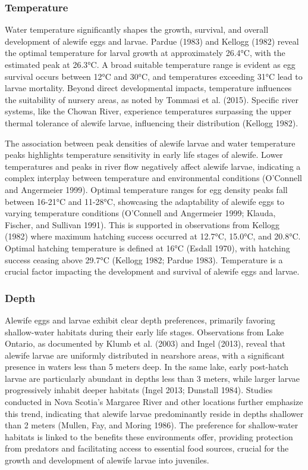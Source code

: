 \documentclass[
]{book}
\begin{document}
\hypertarget{temperature-2}{%
\subsubsection{Temperature}\label{temperature-2}}

Water temperature significantly shapes the growth, survival, and overall development of alewife eggs and larvae. Pardue (1983) and Kellogg (1982) reveal the optimal temperature for larval growth at approximately 26.4°C, with the estimated peak at 26.3°C. A broad suitable temperature range is evident as egg survival occurs between 12°C and 30°C, and temperatures exceeding 31°C lead to larvae mortality. Beyond direct developmental impacts, temperature influences the suitability of nursery areas, as noted by Tommasi et al. (2015). Specific river systems, like the Chowan River, experience temperatures surpassing the upper thermal tolerance of alewife larvae, influencing their distribution (Kellogg 1982).

The association between peak densities of alewife larvae and water temperature peaks highlights temperature sensitivity in early life stages of alewife. Lower temperatures and peaks in river flow negatively affect alewife larvae, indicating a complex interplay between temperature and environmental conditions (O'Connell and Angermeier 1999). Optimal temperature ranges for egg density peaks fall between 16-21°C and 11-28°C, showcasing the adaptability of alewife eggs to varying temperature conditions (O'Connell and Angermeier 1999; Klauda, Fischer, and Sullivan 1991). This is supported in observations from Kellogg (1982) where maximum hatching success occurred at 12.7°C, 15.0°C, and 20.8°C. Optimal hatching temperature is defined at 16°C (Esdall 1970), with hatching success ceasing above 29.7°C (Kellogg 1982; Pardue 1983). Temperature is a crucial factor impacting the development and survival of alewife eggs and larvae.

\hypertarget{depth-2}{%
\subsubsection{Depth}\label{depth-2}}

Alewife eggs and larvae exhibit clear depth preferences, primarily favoring shallow-water habitats during their early life stages. Observations from Lake Ontario, as documented by Klumb et al. (2003) and Ingel (2013), reveal that alewife larvae are uniformly distributed in nearshore areas, with a significant presence in waters less than 5 meters deep. In the same lake, early post-hatch larvae are particularly abundant in depths less than 3 meters, while larger larvae progressively inhabit deeper habitats (Ingel 2013; Dunstall 1984). Studies conducted in Nova Scotia's Margaree River and other locations further emphasize this trend, indicating that alewife larvae predominantly reside in depths shallower than 2 meters (Mullen, Fay, and Moring 1986). The preference for shallow-water habitats is linked to the benefits these environments offer, providing protection from predators and facilitating access to essential food sources, crucial for the growth and development of alewife larvae into juveniles.
\end{document}
